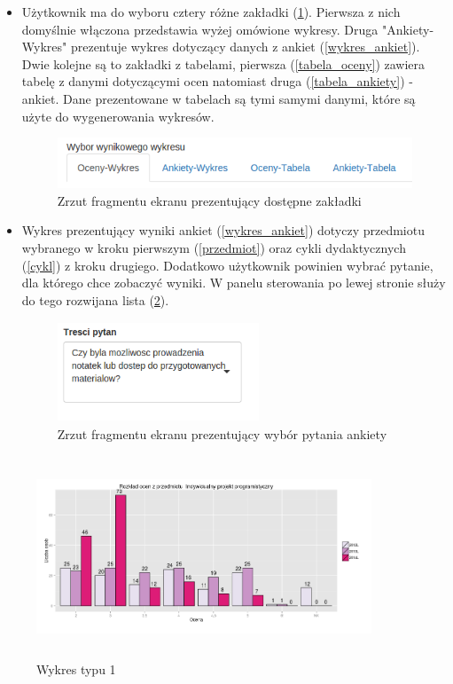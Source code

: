 \documentclass[]{article}
\begin{document}
\begin{itemize}
	\item
	Użytkownik ma do wyboru cztery różne zakładki (\ref{wynik}). Pierwsza z nich domyślnie włączona przedstawia wyżej omówione wykresy. Druga "Ankiety-Wykres" prezentuje wykres dotyczący danych z ankiet (\ref{wykres_ankiet}). Dwie kolejne są to zakładki z tabelami, pierwsza (\ref{tabela_oceny}) zawiera tabelę z danymi dotyczącymi ocen natomiast druga (\ref{tabela_ankiety}) - ankiet. Dane prezentowane w tabelach są tymi samymi danymi, które są użyte do wygenerowania wykresów.
	\begin{figure}[H]
		\centering
		\includegraphics[width=120mm]
		{obrazki/wynik.png}
		\caption{Zrzut fragmentu ekranu prezentujący dostępne zakładki}
		\label{wynik}
	\end{figure}
	
	\item Wykres prezentujący wyniki ankiet (\ref{wykres_ankiet}) dotyczy przedmiotu wybranego w kroku pierwszym (\ref{przedmiot}) oraz cykli dydaktycznych (\ref{cykl}) z kroku drugiego. Dodatkowo użytkownik powinien wybrać pytanie, dla którego chce zobaczyć wyniki. W panelu sterowania po lewej stronie służy do tego rozwijana lista (\ref{pytanie}). 
	\begin{figure}[H]
		\centering
		\includegraphics[width=60mm,height=30mm]
		{obrazki/pytanie.png}
		\caption{Zrzut fragmentu ekranu prezentujący wybór pytania ankiety}
		\label{pytanie}
	\end{figure}
	
\end{itemize}

\begin{figure}[H]
	\centering
	\includegraphics[width=100mm, height=60mm]
	{obrazki/wykres-razem.png}
	\caption{Wykres typu 1}
	\label{wykres_razem}
\end{figure}
\end{document}
